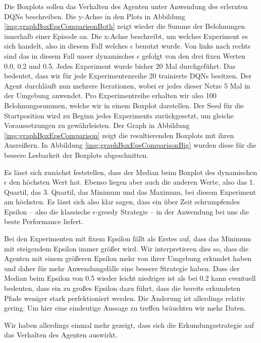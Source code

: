 Die Boxplots sollen das Verhalten des Agenten unter Anwendung des erlernten DQNs beschreiben. Die y-Achse in den Plots in Abbildung \ref{img:graphBoxEpsComparisonBoth} zeigt wieder die Summe der Belohnungen innerhalb einer Episode an. Die x-Achse beschreibt, um welches Experiment es sich handelt, also in diesem Fall welches $ \epsilon $ benutzt wurde. Von links nach rechts sind das in diesem Fall unser dynamisches $ \epsilon $ gefolgt von den drei fixen Werten 0.0, 0.2 und 0.5. Jedes Experiment wurde bisher 20 Mal durchgeführt. Das bedeutet, dass wir für jede Experimentenreihe 20 trainierte DQNs besitzen. Der Agent durchläuft nun mehrere Iterationen, wobei er jedes dieser Netze 5 Mal in der Umgebung anwendet. Pro Experimentreihe erhalten wir also 100 Belohnungssummen, welche wir in einem Boxplot darstellen. Der Seed für die Startposition wird zu Beginn jedes Experiments zurückgesetzt, um gleiche Voraussetzungen zu gewährleisten. Der Graph in Abbildung \ref{img:graphBoxEpsComparison} zeigt die resultierenden Boxplots mit ihren Ausreißern. In Abbildung \ref{img:graphBoxEpsComparisonBig} wurden diese für die bessere Lesbarkeit der Boxplots abgeschnitten.

Es lässt sich zunächst feststellen, dass der Median beim Boxplot des dynamischen $ \epsilon $ den höchsten Wert hat. Ebenso liegen aber auch die anderen Werte, also das 1. Quartil, das 3. Quartil, das Minimum und das Maximum, bei diesem Experiment am höchsten. Es lässt sich also klar sagen, dass ein über Zeit schrumpfendes Epsilon -- also die klassische $ \epsilon $-greedy Strategie -- in der Anwendung bei uns die beste Performance liefert.

Bei den Experimenten mit fixem Epsilon fällt als Erstes auf, dass das Minimum mit steigendem Epsilon immer größer wird. Wir interpretieren dies so, dass die Agenten mit einem größeren Epsilon mehr von ihrer Umgebung erkundet haben und daher für mehr Anwendungsfälle eine bessere Strategie haben. Dass der Median beim Epsilon von 0.5 wieder leicht niedriger ist als bei 0.2 kann eventuell bedeuten, dass ein zu großes Epsilon dazu führt, dass die bereits erkundeten Pfade weniger stark perfektioniert werden. Die Änderung ist allerdings relativ gering. Um hier eine eindeutige Aussage zu treffen bräuchten wir mehr Daten.

Wir haben allerdings einmal mehr gezeigt, dass sich die Erkundungsstrategie auf das Verhalten des Agenten auswirkt.


